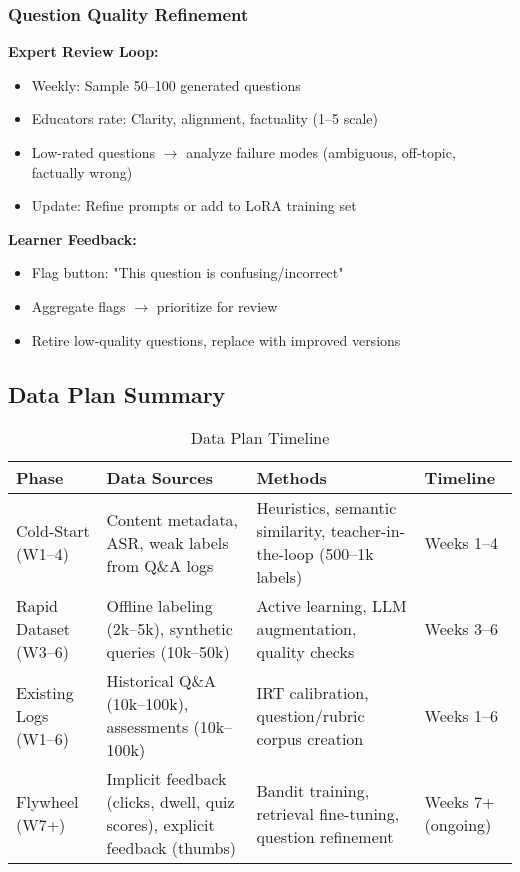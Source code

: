 \documentclass[11pt,letterpaper]{article}
\begin{document}
\subsubsection{Question Quality Refinement}

\textbf{Expert Review Loop:}
\begin{itemize}
\item Weekly: Sample 50--100 generated questions
\item Educators rate: Clarity, alignment, factuality (1--5 scale)
\item Low-rated questions $\rightarrow$ analyze failure modes (ambiguous, off-topic, factually wrong)
\item Update: Refine prompts or add to LoRA training set
\end{itemize}

\textbf{Learner Feedback:}
\begin{itemize}
\item Flag button: "This question is confusing/incorrect"
\item Aggregate flags $\rightarrow$ prioritize for review
\item Retire low-quality questions, replace with improved versions
\end{itemize}

\subsection{Data Plan Summary}

\begin{table}[H]
\centering
\small
\begin{tabular}{@{}p{3cm}p{4cm}p{4cm}p{3cm}@{}}
\toprule
\textbf{Phase} & \textbf{Data Sources} & \textbf{Methods} & \textbf{Timeline} \\
\midrule
Cold-Start (W1--4) & Content metadata, ASR, weak labels from Q\&A logs & Heuristics, semantic similarity, teacher-in-the-loop (500--1k labels) & Weeks 1--4 \\
Rapid Dataset (W3--6) & Offline labeling (2k--5k), synthetic queries (10k--50k) & Active learning, LLM augmentation, quality checks & Weeks 3--6 \\
Existing Logs (W1--6) & Historical Q\&A (10k--100k), assessments (10k--100k) & IRT calibration, question/rubric corpus creation & Weeks 1--6 \\
Flywheel (W7+) & Implicit feedback (clicks, dwell, quiz scores), explicit feedback (thumbs) & Bandit training, retrieval fine-tuning, question refinement & Weeks 7+ (ongoing) \\
\bottomrule
\end{tabular}
\caption{Data Plan Timeline}
\end{table}
\end{document}
